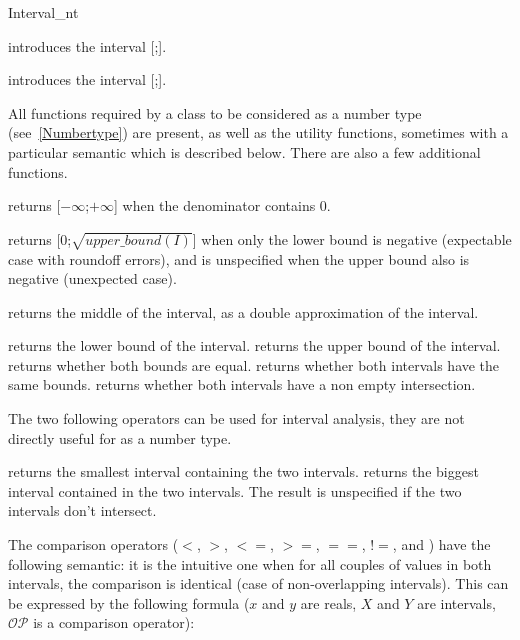\begin{ccRefClass}{Interval_nt}
\ccCreation

{introduces the interval [;].}

{introduces the interval [;].}


\ccOperations
{}

All functions required by a class to be considered as a {\cgal} number type
(see~\ref{Numbertype}) are present, as well as the utility functions,
sometimes with a particular semantic which is described below.  There are also
a few additional functions.


 {returns
[$-\infty$;$+\infty$] when the denominator contains 0.}

 {returns
[0;$\sqrt{upper\_bound(I)}$] when only the lower bound is negative (expectable
case with roundoff errors), and is unspecified when the upper bound also is
negative (unexpected case).}

 {returns the
middle of the interval, as a double approximation of the interval.}

 {returns the lower bound of the interval.}
 {returns the upper bound of the interval.}
 {returns whether both bounds are equal.}
 {returns whether both intervals have
the same bounds.}
 {returns whether both intervals
have a non empty intersection.}

The two following operators can be used for interval analysis, they are not
directly useful for  as a number type.

 {returns the smallest
interval containing the two intervals.}
 {returns the biggest
interval contained in the two intervals.  The result is unspecified if
the two intervals don't intersect.}


The comparison operators ($<$, $>$, $<=$, $>=$, $==$, $!=$, 
and ) have the following semantic: it is the intuitive
one when for all couples of values in both intervals, the comparison
is identical (case of non-overlapping intervals).  This can be expressed
by the following formula ($x$ and $y$ are reals, $X$ and $Y$ are
intervals, $\mathcal{OP}$ is a comparison operator):


\end{ccRefClass}
